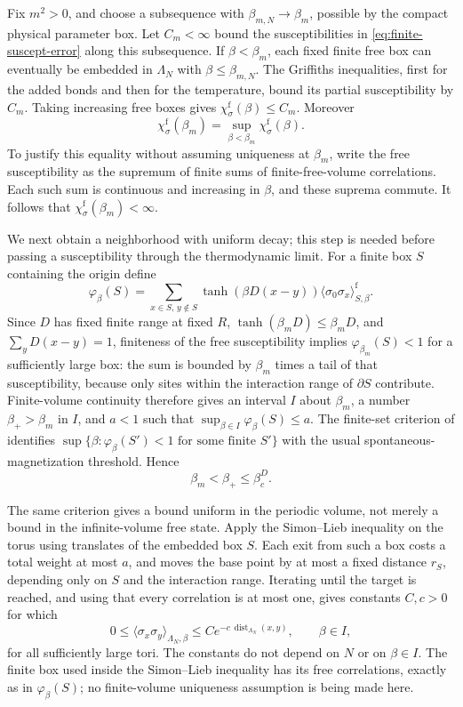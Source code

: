 \documentclass[11pt]{article}
\begin{document}
Fix \(m^2>0\), and choose a subsequence with
\(\beta_{m,N}\to\beta_m\), possible by the compact physical
parameter box. Let \(C_m<\infty\) bound the susceptibilities in
\eqref{eq:finite-suscept-error} along this subsequence. If
\(\beta<\beta_m\), each fixed finite free box can eventually be
embedded in \(\Lambda_N\) with \(\beta\le\beta_{m,N}\).
The Griffiths inequalities, first for the added bonds and then
for the temperature, bound its partial susceptibility by \(C_m\).
Taking increasing free boxes gives
\(\chi_\sigma^{\mathrm f}(\beta)\le C_m\). Moreover
\[
 \chi_\sigma^{\mathrm f}(\beta_m)
   =\sup_{\beta<\beta_m}\chi_\sigma^{\mathrm f}(\beta).
\]
To justify this equality without assuming uniqueness at \(\beta_m\),
write the free susceptibility as the supremum of finite sums of
finite-free-volume correlations. Each such sum is continuous and
increasing in \(\beta\), and these suprema commute. It follows
that \(\chi_\sigma^{\mathrm f}(\beta_m)<\infty\).

We next obtain a neighborhood with uniform decay; this step is
needed before passing a susceptibility through the thermodynamic
limit. For a finite box \(S\) containing the origin define
\[
 \varphi_\beta(S)=
 \sum_{x\in S,\,y\notin S}
  \tanh(\beta D(x-y))
       \langle\sigma_0\sigma_x\rangle^{\mathrm f}_{S,\beta}.
\]
Since \(D\) has fixed finite range at fixed \(R\),
\(\tanh(\beta_mD)\le\beta_mD\), and
\(\sum_yD(x-y)=1\), finiteness of the free susceptibility
implies \(\varphi_{\beta_m}(S)<1\) for a sufficiently large
box: the sum is bounded by \(\beta_m\) times a tail of that
susceptibility, because only sites within the interaction range
of \(\partial S\) contribute. Finite-volume continuity therefore
gives an interval \(I\) about \(\beta_m\), a number
\(\beta_+>\beta_m\) in \(I\), and \(a<1\) such that
\(\sup_{\beta\in I}\varphi_\beta(S)\le a\).
The finite-set criterion of \cite[Section 2]{DCT} identifies
\(\sup\{\beta:\varphi_\beta(S')<1\text{ for some finite }S'\}\)
with the usual spontaneous-magnetization threshold. Hence
\[
 \beta_m<\beta_+\le\beta_c^D.
\]

The same criterion gives a bound uniform in the periodic volume,
not merely a bound in the infinite-volume free state. Apply the
Simon--Lieb inequality on the torus using translates of the
embedded box \(S\). Each exit from such a box costs a total
weight at most \(a\), and moves the base point by at most a
fixed distance \(r_S\), depending only on \(S\) and the
interaction range. Iterating until the target is reached, and
using that every correlation is at most one, gives constants
\(C,c>0\) for which
\begin{equation}\label{eq:uniform-periodic-decay}
 0\le\langle\sigma_x\sigma_y\rangle_{\Lambda_N,\beta}
   \le C e^{-c\,\operatorname{dist}_{\Lambda_N}(x,y)},
 \qquad \beta\in I,
\end{equation}
for all sufficiently large tori. The constants do not depend on
\(N\) or on \(\beta\in I\). The finite box used inside the
Simon--Lieb inequality has its free correlations, exactly as in
\(\varphi_\beta(S)\); no finite-volume uniqueness assumption is
being made here.
\end{document}
